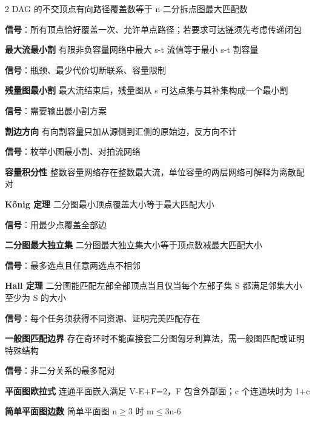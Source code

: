\documentclass[UTF8,fontset=fandol,a4paper,twoside]{ctexart}
\begin{document}
\begin{multicols}{2}
DAG 的不交顶点有向路径覆盖数等于 n-\allowbreak{}二分拆点图最大匹配数\par
\textbf{信号}：所有顶点恰好覆盖一次、允许单点路径；若要求可达链须先考虑传递闭包\par
\par\textbf{最大流最小割}\quad
有限非负容量网络中最大 s-\allowbreak{}t 流值等于最小 s-\allowbreak{}t 割容量\par
\textbf{信号}：瓶颈、最少代价切断联系、容量限制\par
\par\textbf{残量图最小割}\quad
最大流结束后，残量图从 s 可达点集与其补集构成一个最小割\par
\textbf{信号}：需要输出最小割方案\par
\par\textbf{割边方向}\quad
有向割容量只加从源侧到汇侧的原始边，反方向不计\par
\textbf{信号}：枚举小图最小割、对拍流网络\par
\par\textbf{容量积分性}\quad
整数容量网络存在整数最大流，单位容量的两层网络可解释为离散配对\par
\par\textbf{Kőnig 定理}\quad
二分图最小顶点覆盖大小等于最大匹配大小\par
\textbf{信号}：用最少点覆盖全部边\par
\par\textbf{二分图最大独立集}\quad
二分图最大独立集大小等于顶点数减最大匹配大小\par
\textbf{信号}：最多选点且任意两选点不相邻\par
\par\textbf{Hall 定理}\quad
二分图能匹配左部全部顶点当且仅当每个左部子集 S 都满足邻集大小至少为 S 的大小\par
\textbf{信号}：每个任务须获得不同资源、证明完美匹配存在\par
\par\textbf{一般图匹配边界}\quad
存在奇环时不能直接套二分图匈牙利算法，需一般图匹配或证明特殊结构\par
\textbf{信号}：非二分关系的最多配对\par
\par\textbf{平面图欧拉式}\quad
连通平面嵌入满足 V-\allowbreak{}E+\allowbreak{}F=\allowbreak{}2，F 包含外部面；c 个连通块时为 1+\allowbreak{}c\par
\par\textbf{简单平面图边数}\quad
简单平面图 n\ensuremath{\ge}3 时 m\ensuremath{\le}3n-\allowbreak{}6\par

\end{multicols}
\end{document}
